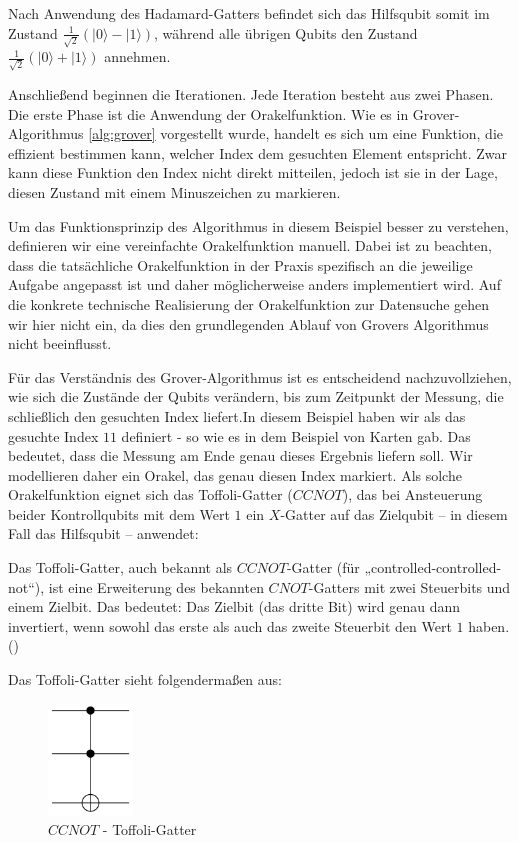{Nach Anwendung des Hadamard-Gatters befindet sich das Hilfsqubit somit im Zustand $\frac{1}{\sqrt{2}}(|0\rangle - |1\rangle)$, während alle übrigen Qubits den Zustand $\frac{1}{\sqrt{2}}(|0\rangle + |1\rangle)$ annehmen.

Anschließend beginnen die Iterationen. Jede Iteration besteht aus zwei Phasen. Die erste Phase ist die Anwendung der Orakelfunktion. Wie es in Grover-Algorithmus \ref{alg:grover} vorgestellt wurde, handelt es sich um eine Funktion, die effizient bestimmen kann, welcher Index dem gesuchten Element entspricht. Zwar kann diese Funktion den Index nicht direkt mitteilen, jedoch ist sie in der Lage, diesen Zustand mit einem Minuszeichen zu markieren.

Um das Funktionsprinzip des Algorithmus in diesem Beispiel besser zu verstehen, definieren wir eine vereinfachte Orakelfunktion manuell. Dabei ist zu beachten, dass die tatsächliche Orakelfunktion in der Praxis spezifisch an die jeweilige Aufgabe angepasst ist und daher möglicherweise anders implementiert wird. Auf die konkrete technische Realisierung der Orakelfunktion zur Datensuche gehen wir hier nicht ein, da dies den grundlegenden Ablauf von Grovers Algorithmus nicht beeinflusst.

Für das Verständnis des Grover-Algorithmus ist es entscheidend nachzuvollziehen, wie sich die Zustände der Qubits verändern, bis zum Zeitpunkt der Messung, die schließlich den gesuchten Index liefert.In diesem Beispiel haben wir als das gesuchte Index $11$ definiert - so wie es in dem Beispiel von Karten gab. Das bedeutet, dass die Messung am Ende genau dieses Ergebnis liefern soll. Wir modellieren daher ein Orakel, das genau diesen Index markiert. Als solche Orakelfunktion eignet sich das Toffoli-Gatter ($CCNOT$), das bei Ansteuerung beider Kontrollqubits mit dem Wert $1$ ein $X$-Gatter auf das Zielqubit – in diesem Fall das Hilfsqubit – anwendet:

\begin{definition}
\label{def:toffoli}
Das Toffoli-Gatter, auch bekannt als $CCNOT$-Gatter (für „controlled-controlled-not“), ist eine Erweiterung des bekannten $CNOT$-Gatters mit zwei Steuerbits und einem Zielbit. Das bedeutet: Das Zielbit (das dritte Bit) wird genau dann invertiert, wenn sowohl das erste als auch das zweite Steuerbit den Wert $1$ haben.(\cite{toffoli_proceedings_1980})
\end{definition}

Das Toffoli-Gatter sieht folgendermaßen aus:
\begin{figure}[H]
    \centering
    \includegraphics[width=0.2\textwidth]{images/basic-algorithms/toffoli.png}
    \caption{$CCNOT$ - Toffoli-Gatter}
    \label{fig:toffoli-gate}
\end{figure}

}
